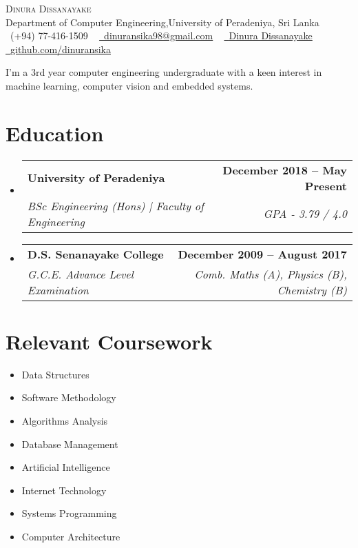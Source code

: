 \documentclass[letterpaper,11pt]{article}
\makeatletter
\newcommand{\resumeSubheading}[4]{
  \vspace{-2pt}\item
    \begin{tabular*}{1.0\textwidth}[t]{l@{\extracolsep{\fill}}r}
      \textbf{#1} & \textbf{\small #2} \\
      \textit{\small#3} & \textit{\small #4} \\
    \end{tabular*}\vspace{-7pt}
}
\newcommand{\resumeSubSubheading}[2]{
    \item
    \begin{tabular*}{1\textwidth}{l@{\extracolsep{\fill}}r}
      \textit{\small#1} & \textit{\small #2} \\
    \end{tabular*}\vspace{-7pt}
}
\newcommand{\resumeSubHeadingListStart}{\begin{itemize}[leftmargin=0.0in, label={}]}
\newcommand{\resumeSubHeadingListEnd}{\end{itemize}}
\makeatother
\begin{document}
\begin{center}
    {\Huge \scshape Dinura Dissanayake} \\ \vspace{1pt}
    Department of Computer Engineering,University of Peradeniya, Sri Lanka  \\ \vspace{1pt}
    \small \raisebox{-0.1\height}\faPhone\ (+94) 77-416-1509 ~ \href{mailto:dinuransika98@gmail.com}{\raisebox{-0.2\height}\faEnvelope\  \underline{dinuransika98@gmail.com}} ~ 
    \href{https://www.linkedin.com/in/dinura-dissanayake/}{\raisebox{-0.2\height}\faLinkedin\ \underline{Dinura Dissanayake}}  ~
    \href{https://github.com/dinuransika}{\raisebox{-0.2\height}\faGithub\ \underline{github.com/dinuransika}} \\ \vspace{1pt}
    \vspace{-8pt}
\end{center}

\vspace{2pt}
I’m a 3rd year computer engineering undergraduate with a keen interest in machine learning, computer vision and embedded systems.
\vspace{-2pt}
\section{Education}
  \resumeSubHeadingListStart
    \resumeSubheading
      {University of Peradeniya}{December 2018 -- May Present}
      {BSc Engineering (Hons) | Faculty of Engineering }{GPA - 3.79 / 4.0}
      \resumeSubheading
      {D.S. Senanayake College}{December 2009 -- August 2017}
      {G.C.E. Advance Level Examination}{Comb. Maths (A), Physics (B), Chemistry (B)}
  \resumeSubHeadingListEnd

\section{Relevant Coursework}
        \begin{multicols}{4}
            \begin{itemize}[itemsep=-5pt, parsep=6pt]
                \item\small Data Structures
                \item Software Methodology
                \item Algorithms Analysis
                \item Database Management
                \item Artificial Intelligence
                \item Internet Technology
                \item Systems Programming
                \item Computer Architecture
            \end{itemize}
        \end{multicols}
        \vspace*{2.0\multicolsep}
\end{document}
